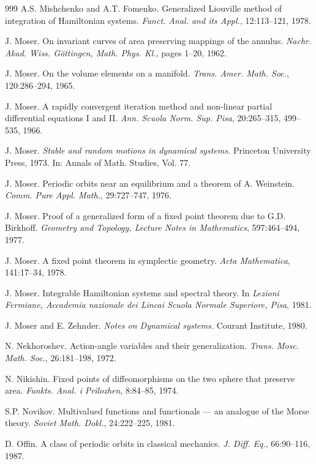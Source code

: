 \begin{thebibliography}{999}
 A.S. Mishchenko and A.T. Fomenko. Generalized Liouville
method of integration of Hamiltonian systems. \emph{Funct. Anal. and
its Appl.}, 12:113--121, 1978.

 J. Moser. On invariant curves of area preserving mappings
of the annulus. \emph{Nachr. Akad. Wiss. Göttingen, Math. Phys. Kl.},
pages 1--20, 1962.

 J. Moser. On the volume elements on a manifold.
\emph{Trans. Amer. Math. Soc.}, 120:286--294, 1965.

 J. Moser. A rapidly convergent iteration method and
non-linear partial differential equations I and II. \emph{Ann. Scuola
Norm. Sup. Pisa}, 20:265--315, 499--535, 1966.

 J. Moser. \emph{Stable and random motions in dynamical
systems.} Princeton University Press, 1973. In: Annals of Math. Studies,
Vol. 77.

 J. Moser. Periodic orbits near an equilibrium and a
theorem of A. Weinstein. \emph{Comm. Pure Appl. Math.}, 29:727--747, 1976.

 J. Moser. Proof of a generalized form of a fixed point
theorem due to G.D. Birkhoff. \emph{Geometry and Topology, Lecture Notes
in Mathematics}, 597:464--494, 1977.

 J. Moser. A fixed point theorem in symplectic geometry.
\emph{Acta Mathematica}, 141:17--34, 1978.

 J. Moser. Integrable Hamiltonian systems and spectral
theory. In \emph{Lezioni Fermiane, Accademia nazionale dei Lincai
Scuola Normale Superiore, Pisa}, 1981.

 J. Moser and E. Zehnder. \emph{Notes on Dynamical
systems.} Courant Institute, 1980.

 N. Nekhoroshev. Action-angle variables and their
generalization. \emph{Trans. Mosc. Math. Soc.}, 26:181--198, 1972.

 N. Nikishin. Fixed points of diffeomorphisms on the two
sphere that preserve area. \emph{Funkts. Anal. i Prilozhen}, 8:84--85,
1974.

 S.P. Novikov. Multivalued functions and functionals ---
an analogue of the Morse theory. \emph{Soviet Math. Dokl.}, 24:222--225,
1981.

 D. Offin. A class of periodic orbits in classical
mechanics. \emph{J. Diff. Eq.}, 66:90--116, 1987.


\end{thebibliography}
